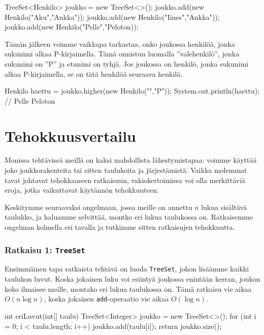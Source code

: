 \begin{code}
TreeSet<Henkilo> joukko = new TreeSet<>();
joukko.add(new Henkilo("Aku","Ankka"));
joukko.add(new Henkilo("Iines","Ankka"));
joukko.add(new Henkilo("Pelle","Peloton));
\end{code}

Tämän jälkeen voimme vaikkapa tarkastaa, onko joukossa henkilöä,
jonka sukunimi alkaa P-kirjaimella.
Tämä onnistuu luomalla ''valehenkilö'', jonka sukunimi
on ''P'' ja etunimi on tyhjä.
Jos joukossa on henkilö, jonka sukunimi alkaa P-kirjaimella,
se on tätä henkilöä seuraava henkilö.

\begin{code}
Henkilo haettu = joukko.higher(new Henkilo("","P"));
System.out.println(haettu); // Pelle Peloton
\end{code}

\section{Tehokkuusvertailu}

Monissa tehtävissä meillä on kaksi mahdollista lähestymistapaa:
voimme käyttää joko joukkorakenteita tai sitten taulukoita ja järjestämistä.
Vaikka molemmat tavat johtavat tehokkaaseen ratkaisuun,
vakiokertoimissa voi olla merkittäviä eroja, jotka vaikuttavat
käytännön tehokkuuteen.

Keskitymme seuraavaksi ongelmaan, jossa meille on annettu
$n$ lukua sisältävä taulukko, ja haluamme selvittää,
montko eri lukua taulukossa on.
Ratkaisemme ongelman kolmella eri tavalla ja tutkimme sitten
ratkaisujen tehokkuutta.

\subsubsection{Ratkaisu 1: \texttt{TreeSet}}

Ensimmäinen tapa ratkaista tehtävä on luoda \texttt{TreeSet},
johon lisäämme kaikki taulukon luvut.
Koska jokainen luku voi esiintyä joukossa enintään kerran,
joukon koko ilmaisee meille, montako eri lukua taulukossa on.
Tämä ratkaisu vie aikaa $O(n \log n)$, koska jokainen
\texttt{add}-operaatio vie aikaa $O(\log n)$.

\begin{code}
int eriLuvut(int[] taulu) {
    TreeSet<Integer> joukko = new TreeSet<>();
    for (int i = 0; i < taulu.length; i++) {
        joukko.add(taulu[i]);
    }
    return joukko.size();
}
\end{code}

